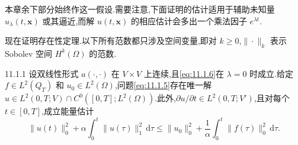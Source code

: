 本章余下部分始终作这一假设.需要注意,下面证明的估计适用于辅助未知量 \(u_\lambda(t,\boldsymbol{x})\) 或其逼近,而解 \(u(t,\boldsymbol{x})\) 的相应估计会多出一个乘法因子 \(e^{\lambda t}\).

现在证明存在性定理.以下所有范数都只涉及空间变量,即对 \(k\ge0\),\(\|\cdot\|_k\) 表示 Sobolev 空间 \(H^k(\Omega)\) 的范数.

\begin{theorem}[]{11.1.1}
设双线性形式 \(a(\cdot,\cdot)\) 在 \(V\times V\) 上连续,且\eqref{eq:11.1.6}在 \(\lambda=0\) 时成立.给定 \(f\in L^2(Q_T)\) 和 \(u_0\in L^2(\Omega)\),问题\eqref{eq:11.1.5}存在唯一解 \(u\in L^2(0,T;V)\cap C^0([0,T];L^2(\Omega))\).此外,\(\partial u/\partial t\in L^2(0,T;V')\),且对每个 \(t\in[0,T]\),成立能量估计
\begin{equation}\label{eq:11.1.7}
  \|u(t)\|_0^2+\alpha\int_0^t\|u(\tau)\|_1^2\,\mathrm d\tau
     \le\|u_0\|_0^2+\frac1\alpha\int_0^t\|f(\tau)\|_0^2\,\mathrm d\tau.
\end{equation}
\end{theorem}

